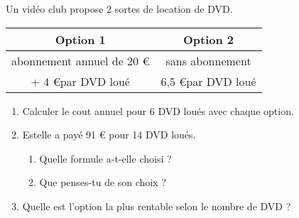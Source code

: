 
Un vidéo club propose 2 sortes de location de DVD.

\begin{center}
\begin{tabular}{|c|c|}
 \hline 
 Option 1 &  Option 2 \\ 
  \hline
 abonnement annuel de 20 \euro{} &  sans abonnement \\
 + 4 \euro par DVD loué & 6,5 \euro par DVD loué \\ 
 \hline 
 \end{tabular}  
\end{center}

\begin{enumerate}
\item Calculer le cout annuel pour 6 DVD loués avec chaque option.
\item Estelle a payé 91 \euro{} pour 14 DVD loués. 
\begin{enumerate}
\item Quelle formule a-t-elle choisi ? 
\item Que penses-tu de son choix ?
\end{enumerate}
\item Quelle est l'option la plus rentable selon le nombre de DVD ?
\end{enumerate}